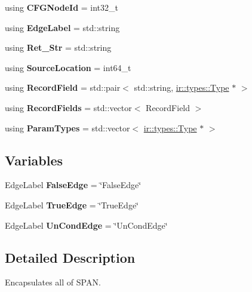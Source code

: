 \begin{DoxyCompactItemize}
\item 
\mbox{\label{namespacespan_a34e8d849ca2007fe03cb1817685d08bf}} 
using {\bfseries C\+F\+G\+Node\+Id} = int32\+\_\+t
\item 
\mbox{\label{namespacespan_a99c0bad50bca2ad55a141c7d6278080a}} 
using {\bfseries Edge\+Label} = std\+::string
\item 
\mbox{\label{namespacespan_a141b06f8d19a7143d5b8dde1574f37e0}} 
using {\bfseries Ret\+\_\+\+Str} = std\+::string
\item 
\mbox{\label{namespacespan_af470de4d5c68a3b7b6178425b1e77880}} 
using {\bfseries Source\+Location} = int64\+\_\+t
\item 
\mbox{\label{namespacespan_ab46e3b7419658b0eb78db6f133231a48}} 
using {\bfseries Record\+Field} = std\+::pair$<$ std\+::string, \hyperlink{classspan_1_1ir_1_1types_1_1Type}{ir\+::types\+::\+Type} $\ast$ $>$
\item 
\mbox{\label{namespacespan_ab69cc11d4f9886a82735705636161e8d}} 
using {\bfseries Record\+Fields} = std\+::vector$<$ Record\+Field $>$
\item 
\mbox{\label{namespacespan_adc9f90fbd67be58be6995b021a4caac8}} 
using {\bfseries Param\+Types} = std\+::vector$<$ \hyperlink{classspan_1_1ir_1_1types_1_1Type}{ir\+::types\+::\+Type} $\ast$ $>$
\end{DoxyCompactItemize}
\subsection*{Variables}
\begin{DoxyCompactItemize}
\item 
\mbox{\label{namespacespan_aa3c2bff0d8a76b2417544a9460ed5249}} 
Edge\+Label {\bfseries False\+Edge} = \char`\"{}False\+Edge\char`\"{}
\item 
\mbox{\label{namespacespan_a0437d96ab68511dfef0722ba77d94743}} 
Edge\+Label {\bfseries True\+Edge} = \char`\"{}True\+Edge\char`\"{}
\item 
\mbox{\label{namespacespan_a80845b914198b53440cb7c8dea102ee7}} 
Edge\+Label {\bfseries Un\+Cond\+Edge} = \char`\"{}Un\+Cond\+Edge\char`\"{}
\end{DoxyCompactItemize}


\subsection{Detailed Description}
Encapsulates all of S\+P\+AN. 